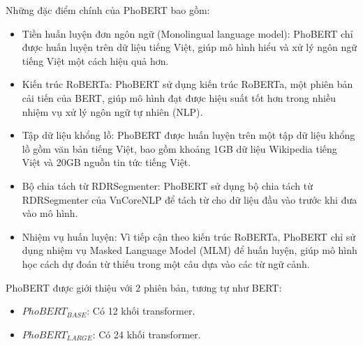 Những đặc điểm chính của PhoBERT bao gồm:
\begin{itemize}
    \item Tiền huấn luyện đơn ngôn ngữ (Monolingual language model): PhoBERT chỉ được huấn luyện trên dữ liệu tiếng Việt, giúp mô hình hiểu và xử lý ngôn ngữ tiếng Việt một cách hiệu quả hơn.
    \item Kiến trúc RoBERTa: PhoBERT sử dụng kiến trúc RoBERTa, một phiên bản cải tiến của BERT, giúp mô hình đạt được hiệu suất tốt hơn trong nhiều nhiệm vụ xử lý ngôn ngữ tự nhiên (NLP).
    \item Tập dữ liệu khổng lồ: PhoBERT được huấn luyện trên một tập dữ liệu khổng lồ gồm văn bản tiếng Việt, bao gồm khoảng 1GB dữ liệu Wikipedia tiếng Việt và 20GB nguồn tin tức tiếng Việt.
    \item Bộ chia tách từ RDRSegmenter: PhoBERT sử dụng bộ chia tách từ RDRSegmenter của VnCoreNLP để tách từ cho dữ liệu đầu vào trước khi đưa vào mô hình.
    \item Nhiệm vụ huấn luyện: Vì tiếp cận theo kiến trúc RoBERTa, PhoBERT chỉ sử dụng nhiệm vụ Masked Language Model (MLM) để huấn luyện, giúp mô hình học cách dự đoán từ thiếu trong một câu dựa vào các từ ngữ cảnh.
\end{itemize}

PhoBERT được giới thiệu với 2 phiên bản, tương tự như BERT:
\begin{itemize}
    \item $PhoBERT_{BASE}$: Có 12 khối transformer.
    \item $PhoBERT_{LARGE}$: Có 24 khối transformer.
\end{itemize}


